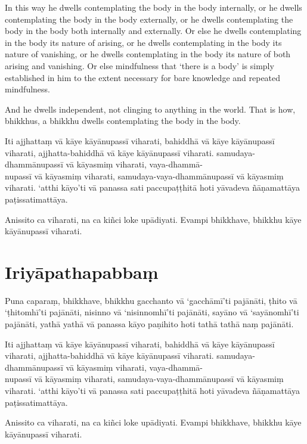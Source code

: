 In this way he dwells contemplating the body in the body internally, or he
dwells contemplating the body in the body externally, or he dwells contemplating
the body in the body both internally and externally. Or else he dwells
contemplating in the body its nature of arising, or he dwells contemplating in
the body its nature of vanishing, or he dwells contemplating in the body its
nature of both arising and vanishing. Or else mindfulness that ‘there is a body’
is simply established in him to the extent necessary for bare knowledge and
repeated mindfulness.

And he dwells independent, not clinging to anything in the world. That is how,
bhikkhus, a bhikkhu dwells contemplating the body in the body.


\paliPage

Iti ajjhattaṃ vā kāye kāyānupassī viharati, bahiddhā vā kāye kāyānupassī
viharati, ajjhatta-bahiddhā vā kāye kāyānupassī viharati. samudaya-dhammānupassī
vā kāyasmiṃ viharati, vaya-dhammā-\\
nupassī vā kāyasmiṃ viharati, samudaya-vaya-dhammānupassī vā kāyasmiṃ viharati.
‘atthi kāyo’ti vā panassa sati paccupaṭṭhitā hoti yāvadeva ñāṇamattāya
paṭissatimattāya.

Anissito ca viharati, na ca kiñci loke upādiyati. Evampi bhikkhave, bhikkhu kāye
kāyānupassī viharati.


\section*{Iriyāpathapabbaṃ}

Puna caparaṃ, bhikkhave, bhikkhu gacchanto vā ‘gacchāmī’ti pajānāti, ṭhito vā
‘ṭhitomhī’ti pajānāti, nisinno vā ‘nisinnomhī’ti pajānāti, sayāno vā ‘sayānomhī’ti
pajānāti, yathā yathā vā panassa kāyo paṇihito hoti tathā tathā naṃ pajānāti.

Iti ajjhattaṃ vā kāye kāyānupassī viharati, bahiddhā vā kāye kāyānupassī
viharati, ajjhatta-bahiddhā vā kāye kāyānupassī viharati. samudaya-dhammānupassī
vā kāyasmiṃ viharati, vaya-dhammā-\\
nupassī vā kāyasmiṃ viharati, samudaya-vaya-dhammānupassī vā kāyasmiṃ viharati.
‘atthi kāyo’ti vā panassa sati paccupaṭṭhitā hoti yāvadeva ñāṇamattāya
paṭissatimattāya.

Anissito ca viharati, na ca kiñci loke upādiyati. Evampi bhikkhave, bhikkhu kāye
kāyānupassī viharati.

